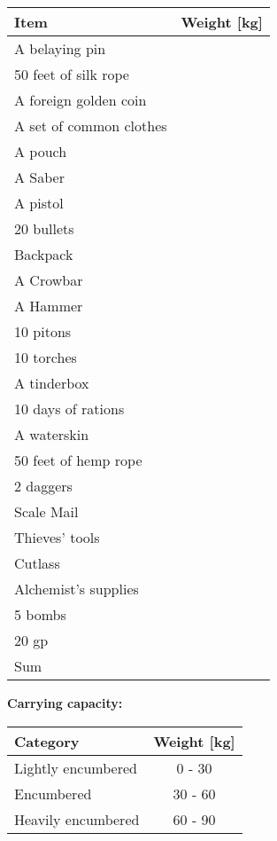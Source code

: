\documentclass[11pt]{article}
\begin{document}
	\begin{tabularx}{\textwidth}{X|r}
Item & Weight [kg] \\
\hline
A belaying pin 								&  			\\
50 feet of silk rope						&  			\\
A foreign golden coin 						&  			\\
A set of common clothes 					&  			\\
A pouch		 								&  			\\
A Saber		 								&  			\\
A pistol	 								&  			\\
20 bullets	 								&  			\\
Backpack 									&  			\\
A Crowbar	 								&  			\\
A Hammer	 								&  			\\
10 pitons	 								&  			\\
10 torches	 								&  			\\
A tinderbox	 								&  			\\
10 days of rations							&  			\\
A waterskin 								&  			\\
50 feet of hemp rope 						&  			\\
2 daggers 									&  			\\
Scale Mail	 								&  			\\
Thieves' tools 								&  			\\
Cutlass		 								&  			\\
Alchemist's supplies 						&  			\\
5 bombs		 								&  			\\
20 gp					 					& 			\\
\hline
Sum 										& 
	\end{tabularx}

\vspace{10mm}

\textbf{Carrying capacity:} \\

	\begin{tabular}{l|c}
Category & Weight [kg] \\
\hline
Lightly encumbered 	& 0 - 30 	\\
Encumbered 			& 30 - 60 	\\
Heavily encumbered	& 60 - 90
	\end{tabular}
\end{document}
